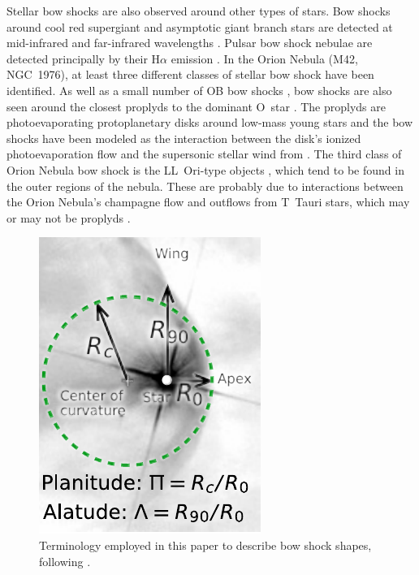 Stellar bow shocks are also observed around other types of stars. Bow
shocks around cool red supergiant and asymptotic giant branch stars
are detected at mid-infrared and far-infrared wavelengths
\citep{Ueta:2006a, Ueta:2008a, Sahai:2010a, Cox:2012a}.  Pulsar bow
shock nebulae are detected principally by their H\(\alpha\) emission
\citep{Kulkarni:1988a, Brownsberger:2014a}.  In the Orion Nebula (M42,
NGC~1976), at least three different classes of stellar bow shock have
been identified. As well as a small number of OB bow shocks
\citep{Smith:2005a, ODell:2001c}, bow shocks are also seen around the
closest proplyds to the dominant O~star \thC{} \citep{Hayward:1994a,
  Bally:1998a, Robberto:2005a}.  The proplyds \citep{ODell:2008b} are
photoevaporating protoplanetary disks around low-mass young stars
\citep{Johnstone:1998a} and the bow shocks have been modeled as the
interaction between the disk's ionized photoevaporation flow and the
supersonic stellar wind from \thC{} \citep{Garcia-Arredondo:2001a}.
The third class of Orion Nebula bow shock is the LL~Ori-type objects
\citetext{\citealp{Gull:1979a}; \S~5 of \citealp{Bally:2000a}; \S~3.2
  of \citealp{Bally:2001a}; \citealp{Henney:2013a}}, which tend to be
found in the outer regions of the nebula.  These are probably due to
interactions between the Orion Nebula's champagne flow
\citep{Zuckerman:1973a} and outflows from T~Tauri stars, which may or
may not be proplyds \citep{Bally:2000a, Gutierrez-Soto:2015a}.

\begin{figure}
  \centering
  \includegraphics[width=0.6\linewidth]{figs/obs-shape-terminology}
  \caption[Terminology]{Terminology employed in this paper to describe
    bow shock shapes, following \citet[Paper~0]{Tarango-Yong:2018a}.}
  \label{fig:obs-shape-terminology}
\end{figure}

